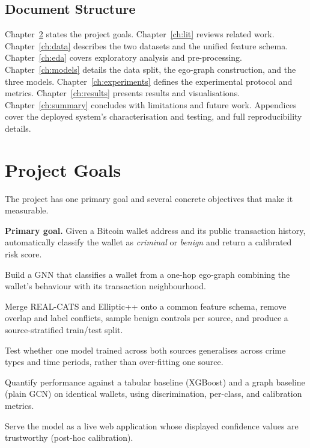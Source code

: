 \documentclass[12pt,a4paper,openany]{report}
\begin{document}
\section{Document Structure}
Chapter~\ref{ch:goals} states the project goals. Chapter~\ref{ch:lit} reviews related work.
Chapter~\ref{ch:data} describes the two datasets and the unified feature schema.
Chapter~\ref{ch:eda} covers exploratory analysis and pre-processing. Chapter~\ref{ch:models}
details the data split, the ego-graph construction, and the three models.
Chapter~\ref{ch:experiments} defines the experimental protocol and metrics.
Chapter~\ref{ch:results} presents results and visualisations. Chapter~\ref{ch:summary}
concludes with limitations and future work. Appendices cover the deployed system's
characterisation and testing, and full reproducibility details.

\chapter{Project Goals}\label{ch:goals}
The project has one primary goal and several concrete objectives that make it measurable.

\vspace{2pt}
\noindent\textbf{Primary goal.} Given a Bitcoin wallet address and its public transaction
history, automatically classify the wallet as \emph{criminal} or \emph{benign} and return a
calibrated risk score.

\begin{description}[leftmargin=1.3em,style=nextline,itemsep=3pt]
  \item[G1 --- Graph model.] Build a GNN that classifies a wallet from a one-hop ego-graph
    combining the wallet's behaviour with its transaction neighbourhood.
  \item[G2 --- Unified corpus.] Merge REAL-CATS and Elliptic++ onto a common
    feature schema, remove overlap and label conflicts, sample benign controls per source,
    and produce a source-stratified train/test split.
  \item[G3 --- Cross-dataset generalisation.] Test whether one model trained across both
    sources generalises across crime types and time periods, rather than over-fitting one source.
  \item[G4 --- Rigorous evaluation.] Quantify performance against a tabular baseline (XGBoost)
    and a graph baseline (plain GCN) on identical wallets, using discrimination, per-class, and
    calibration metrics.
  \item[G5 --- Usable, calibrated product.] Serve the model as a live web application whose
    displayed confidence values are trustworthy (post-hoc calibration).
\end{description}
\end{document}

